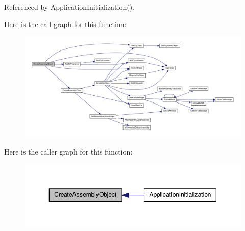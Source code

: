 \-Referenced by \-Application\-Initialization().



\-Here is the call graph for this function\-:
\nopagebreak
\begin{figure}[H]
\begin{center}
\leavevmode
\includegraphics[width=350pt]{d2/dc9/group__CIP__API_gae61b613fed863d30428e78b2311bf593_cgraph}
\end{center}
\end{figure}




\-Here is the caller graph for this function\-:
\nopagebreak
\begin{figure}[H]
\begin{center}
\leavevmode
\includegraphics[width=350pt]{d2/dc9/group__CIP__API_gae61b613fed863d30428e78b2311bf593_icgraph}
\end{center}
\end{figure}


